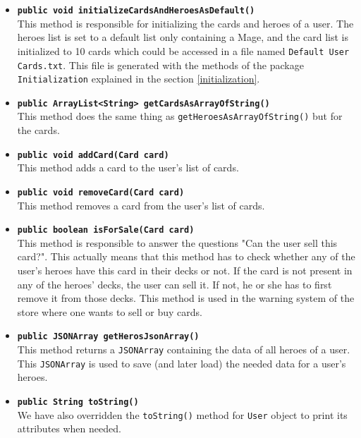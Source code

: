\documentclass[a4paper]{article}
\begin{document}
\begin{itemize}
	\item \texttt{\textbf{public void initializeCardsAndHeroesAsDefault()}}\\
	This method is responsible for initializing the cards and heroes of a user. The heroes list is set to a default list only containing a Mage, and the card list is initialized to 10 cards which could be accessed in a file named \texttt{Default User Cards.txt}. This file is generated with the methods of the package \texttt{Initialization} explained in the section \ref{initialization}.
	
	\item \texttt{\textbf{public ArrayList<String> getCardsAsArrayOfString()}}\\
	This method does the same thing as \texttt{getHeroesAsArrayOfString()} but for the cards.
	
	\item \texttt{\textbf{public void addCard(Card card)}}\\
	This method adds a card to the user's list of cards.
	
	\item \texttt{\textbf{public void removeCard(Card card)}}\\
	This method removes a card from the user's list of cards.
		
	\item \texttt{\textbf{public boolean isForSale(Card card)}}\\
	This method is responsible to answer the questions "Can the user sell this card?". This actually means that this method has to check whether any of the user's heroes have this card in their decks or not. If the card is not present in any of the heroes' decks, the user can sell it. If not, he or she has to first remove it from those decks. This method is used in the warning system of the store where one wants to sell or buy cards.
	
	\item \texttt{\textbf{public JSONArray getHerosJsonArray()}}\\
	This method returns a \texttt{JSONArray} containing the data of all heroes of a user. This \texttt{JSONArray} is used to save (and later load) the needed data for a user's heroes.
	
	\item \texttt{\textbf{public String toString()}}\\
	We have also overridden the \texttt{toString()} method for \texttt{User} object to print its attributes when needed.
	
\end{itemize}
\end{document}
